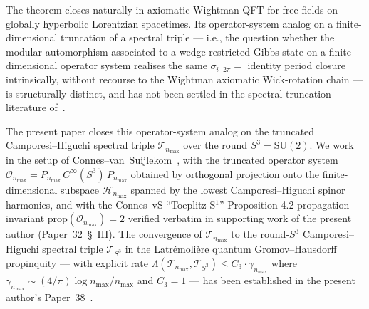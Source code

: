 \documentclass[11pt,a4paper]{article}
\theoremstyle{plain}
\theoremstyle{definition}
\newcommand{\nmax}{n_{\max}}
\newcommand{\sthree}{S^{3}}
\newcommand{\Hilb}{\mathcal{H}}
\newcommand{\Op}{\mathcal{O}}
\newcommand{\Tcal}{\mathcal{T}}
\newcommand{\SU}{\mathrm{SU}}
\begin{document}
The theorem closes naturally in axiomatic Wightman QFT for free fields
on globally hyperbolic Lorentzian spacetimes. Its operator-system
analog on a finite-dimensional truncation of a spectral triple --- i.e.,
the question whether the modular automorphism associated to a
wedge-restricted Gibbs state on a finite-dimensional operator system
realises the same $\sigma_{i \cdot 2\pi} = $ identity period closure
intrinsically, without recourse to the Wightman axiomatic Wick-rotation
chain --- is structurally distinct, and has not been settled in the
spectral-truncation literature
of~\cite{connes_vs2021, leimbach_vs2024, hekkelman_mcdonald2024}.

The present paper closes this operator-system analog on the truncated
Camporesi--Higuchi spectral triple $\Tcal_{\nmax}$ over the round
$\sthree = \SU(2)$. We work in the setup of
Connes--van~Suijlekom~\cite{connes_vs2021}, with the truncated
operator system $\Op_{\nmax} = P_{\nmax} \, C^\infty(\sthree) \,
P_{\nmax}$ obtained by orthogonal projection onto the
finite-dimensional subspace $\Hilb_{\nmax}$ spanned by the lowest
Camporesi--Higuchi spinor harmonics, and with the Connes--vS
``Toeplitz S$^1$'' Proposition 4.2 propagation invariant
$\mathrm{prop}(\Op_{\nmax}) = 2$ verified verbatim in supporting work
of the present author (Paper~32~\S~III). The convergence of
$\Tcal_{\nmax}$ to the round-$\sthree$ Camporesi--Higuchi spectral
triple $\Tcal_{\sthree}$ in the Latr\'emoli\`ere quantum
Gromov--Hausdorff propinquity --- with explicit rate
$\Lambda(\Tcal_{\nmax}, \Tcal_{\sthree}) \le C_3 \cdot \gamma_{\nmax}$
where $\gamma_{\nmax} \sim (4/\pi) \log \nmax / \nmax$ and $C_3 = 1$
--- has been established in the present author's Paper~38~\cite{paper38}.
\end{document}
